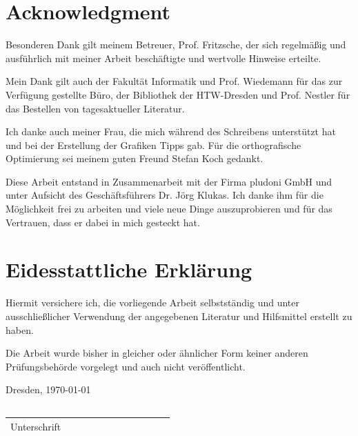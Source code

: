 \tableofcontents		%
\newpage
\section*{Acknowledgment}
 
Besonderen Dank gilt meinem Betreuer, Prof. Fritzsche, der sich regelmäßig und ausführlich mit meiner Arbeit beschäftigte und wertvolle Hinweise erteilte.

Mein Dank gilt auch der Fakultät Informatik und Prof. Wiedemann für das zur Verfügung gestellte Büro, der Bibliothek der HTW-Dresden und Prof. Nestler für das Bestellen von tagesaktueller Literatur.
 
Ich danke auch meiner Frau, die mich während des Schreibens unterstützt hat und bei der Erstellung der Grafiken Tipps gab. Für die orthografische Optimierung sei meinem guten Freund Stefan Koch gedankt.
 
Diese Arbeit entstand in Zusammenarbeit mit der Firma pludoni GmbH und unter Aufsicht des Geschäftsführers Dr. Jörg Klukas. Ich danke ihm für die Möglichkeit frei zu arbeiten und viele neue Dinge auszuprobieren und für das Vertrauen, dass er dabei in mich gesteckt hat.
 
\newpage
\section*{Eidesstattliche Erklärung}
	Hiermit versichere ich, die vorliegende Arbeit selbstständig und unter ausschließlicher Verwendung
	der angegebenen Literatur und Hilfsmittel erstellt zu haben.

	Die Arbeit wurde bisher in gleicher oder ähnlicher Form keiner anderen Prüfungsbehörde vorgelegt
	und auch nicht veröffentlicht.\bigskip

	Dresden, \today

\underline{\ \ \ \ \ \ \ \ \ \ \ \ \ \ \ \ \ \ \ \ \ \ \ \ \ \ \ \ \ \ \ \ \ \ }\\
\hspace*{1em}\small{\ Unterschrift} 